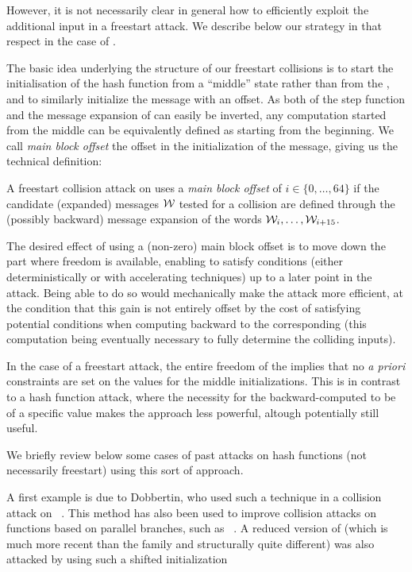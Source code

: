 However, it is not necessarily clear in general how to efficiently exploit the additional input in a freestart attack. We describe below our strategy in that respect
in the case of \shaone.

\medskip

The basic idea underlying the structure of our freestart collisions is to start the initialisation of the hash function from a ``middle'' state rather than from the \iv,
and to similarly initialize the message with an offset. As both of the step function and the message expansion of \shaone can easily be inverted, any computation started
from the middle can be equivalently defined as starting from the beginning. We call \emph{main block offset} the offset in the initialization of the message, giving us
the technical definition:

\begin{defi}
A freestart collision attack on \shaone uses a \emph{main block offset} of $i \in \{0, \ldots, 64\}$ if the candidate (expanded) messages $\mathcal{W}$ tested for a collision are defined
through the (possibly backward) message expansion of the words $\mathcal{W}_i, \ldots, \mathcal{W}_{i + 15}$.
\end{defi}

The desired effect of using a (non-zero) main block offset is to move down the part where freedom is available, enabling to satisfy conditions (either deterministically or with accelerating techniques)
up to a later point in the attack. Being able to do so would mechanically make the attack more efficient, at the condition that this gain is not entirely offset by the cost
of satisfying potential conditions when computing backward to the corresponding \iv (this computation being eventually necessary to fully determine the colliding inputs).

In the case of a freestart attack, the entire freedom of the \iv implies that no \emph{a priori} constraints are set on the values for the middle initializations. This is in contrast to a hash function attack, where
the necessity for the backward-computed \iv to be of a specific value makes the approach less powerful, altough potentially still useful.

We briefly review below some cases of past attacks on hash functions (not necessarily freestart) using this sort of approach.

\medskip

A first example is due to Dobbertin, who used such a technique in a collision attack on \mdfour~\cite{DBLP:conf/fse/Dobbertin96}.
This method has also been used to improve collision attacks on functions based on parallel branches, such as \ripemdote~\cite{DBLP:conf/eurocrypt/LandelleP13}.
A reduced version of \groestl (which is much more recent than the \mdsha family and structurally quite different) was also attacked by using such a shifted initialization~\cite{DBLP:conf/fse/MendelRS14}

